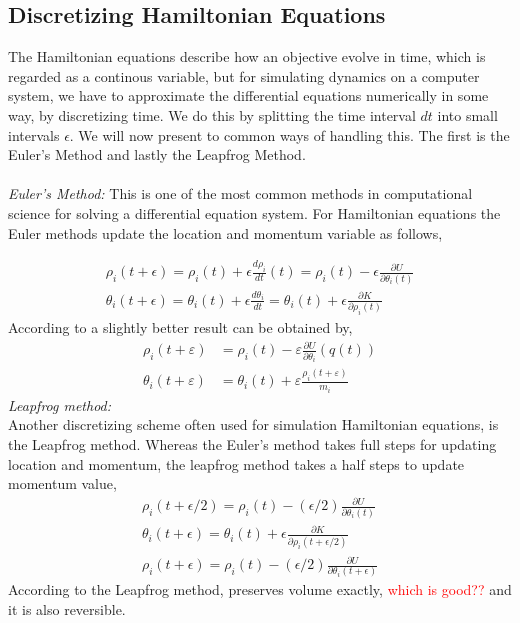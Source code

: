 \subsection{Discretizing Hamiltonian Equations}
The Hamiltonian equations describe how an objective evolve in time, which is regarded as a continous variable, but for simulating dynamics on a computer system, we have to approximate the differential equations numerically in some way, by discretizing time. We do this by splitting the time interval $dt$ into small intervals $\epsilon$. We will now present to common ways of handling this. The first is the Euler's Method and lastly the Leapfrog Method.
\\
\\
\textit{Euler’s Method:}
This is one of the most common methods in computational science for solving a differential equation system. For Hamiltonian equations the Euler methods update the location and momentum variable as follows,

\begin{equation*}
\begin{split}
\rho_{i}(t+\epsilon)=\rho_{i}(t)+\epsilon \frac{d \rho_{i}}{d t}(t)=\rho_{i}(t)-\epsilon \frac{\partial U}{\partial \theta_{i}(t)} \\
\theta_{i}(t+\epsilon)=\theta_{i}(t)+\epsilon \frac{d \theta_{i}}{d t}=\theta_{i}(t)+\epsilon \frac{\partial K}{\partial \rho_{i}(t)}
\end{split}
\end{equation*}
According to \cite{neal2012mcmc} a slightly better result can be obtained by,
\begin{equation*}
\begin{split}
\rho_{i}(t+\varepsilon) &=\rho_{i}(t)-\varepsilon \frac{\partial U}{\partial \theta_{i}}(q(t)) \\
\theta_{i}(t+\varepsilon) &=\theta_{i}(t)+\varepsilon \frac{\rho_{i}(t+\varepsilon)}{m_{i}}
\end{split}
\end{equation*}
\textit{Leapfrog method:}\\
Another discretizing scheme often used for simulation Hamiltonian equations, is the Leapfrog method. Whereas the Euler’s method takes full steps for updating location and momentum, the leapfrog method takes a half steps to update momentum value,
\begin{equation*}
\begin{split}
\rho_{i}(t+\epsilon / 2)=\rho_{i}(t)-(\epsilon / 2) \frac{\partial U}{\partial \theta_{i}(t)} \\
\theta_{i}(t+\epsilon)=\theta_{i}(t)+\epsilon \frac{\partial K}{\partial \rho_{i}(t+\epsilon / 2)} \\
\rho_{i}(t+\epsilon)=\rho_{i}(t)-(\epsilon / 2) \frac{\partial U}{\partial \theta_{i}(t+\epsilon)}
\end{split}
\end{equation*}
According to \cite{neal2012mcmc} the Leapfrog method, preserves volume exactly, \textcolor{red}{which is good??} and it is also reversible. 

